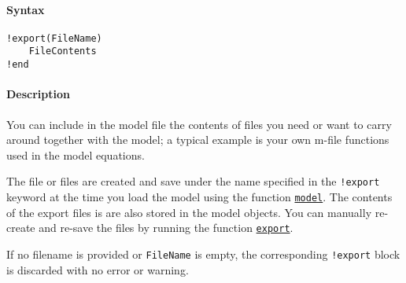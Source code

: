


	\paragraph{Syntax}\label{syntax}

\begin{verbatim}
!export(FileName)
    FileContents
!end
\end{verbatim}

\paragraph{Description}\label{description}

You can include in the model file the contents of files you need or want
to carry around together with the model; a typical example is your own
m-file functions used in the model equations.

The file or files are created and save under the name specified in the
\texttt{!export} keyword at the time you load the model using the
function \href{model/model}{\texttt{model}}. The contents of the export
files is are also stored in the model objects. You can manually
re-create and re-save the files by running the function
\href{model/export}{\texttt{export}}.

If no filename is provided or \texttt{FileName} is empty, the
corresponding \texttt{!export} block is discarded with no error or
warning.


